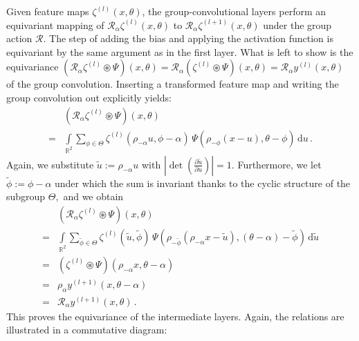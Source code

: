 \documentclass[10pt,twocolumn,letterpaper]{article}
\begin{document}
Given feature maps $\zeta^{(l)}(x,\theta)$, the group-convolutional layers perform an equivariant mapping of $\mathcal{R}_\alpha\zeta^{(l)}(x,\theta)$ to $\mathcal{R}_\alpha\zeta^{(l+1)}(x,\theta)$ under the group action $\mathcal{R}.$
The step of adding the bias and applying the activation function is equivariant by the same argument as in the first layer.
What is left to show is the equivariance $\left(\mathcal{R}_\alpha\zeta^{(l)}\circledast\Psi\right)(x,\theta) = \mathcal{R}_\alpha\left(\zeta^{(l)}\circledast\Psi\right)(x,\theta) = \mathcal{R}_\alpha y^{(l)}(x,\theta)$ of the group convolution.
Inserting a transformed feature map and writing the group convolution out explicitly yields:
\begin{align*}
& \left(\mathcal{R}_\alpha\zeta^{(l)}\circledast\Psi\right)(x,\theta) \\
=& \int\limits_{\mathbb{R}^2} \sum_{\phi\in\Theta} \zeta^{(l)}(\rho_{-\alpha}u,\phi-\alpha)\, \Psi(\rho_{-\phi}(x-u),\theta-\phi) \, \mathrm{d}u \,.
\end{align*}
Again, we substitute $\tilde{u}:=\rho_{-\alpha}u$ with $\left|\det\left(\frac{\partial \tilde{u}}{\partial u}\right)\right|=1.$
Furthermore, we let $\tilde{\phi}:=\phi-\alpha$ under which the sum is invariant thanks to the cyclic structure of the subgroup $\Theta,$ and we obtain
\begin{align*}
	& \left(\mathcal{R}_\alpha\zeta^{(l)}\circledast\Psi\right)(x,\theta) \\
	=& \int\limits_{\mathbb{R}^2} \sum_{\tilde{\phi}\in\Theta} \zeta^{(l)}(\tilde{u},\tilde{\phi})\, \Psi(\rho_{-\tilde{\phi}}(\rho_{-\alpha}x-\tilde{u}),(\theta-\alpha) - \tilde{\phi}) \, \mathrm{d}\tilde{u}\\
	=& \left(\zeta^{(l)}\circledast\Psi\right)(\rho_{-\alpha}x,\theta-\alpha) \\
	=& \rho_\alpha y^{(l+1)}(x,\theta-\alpha) \\
	=& \mathcal{R}_\alpha y^{(l+1)}(x,\theta)\,.
\end{align*}
This proves the equivariance of the intermediate layers.
Again, the relations are illustrated in a commutative diagram:
\begin{center}
\end{center}
\end{document}

